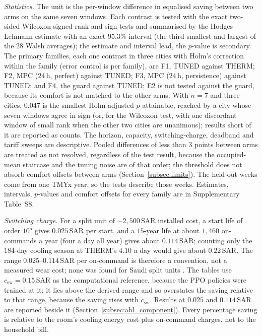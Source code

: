 \documentclass[pdflatex,sn-mathphys-num,iicol]{sn-jnl}
\theoremstyle{thmstyleone}\newtheorem{proposition}{Proposition}\newtheorem{corollary}{Corollary}
\theoremstyle{thmstyletwo}\newtheorem{remark}{Remark}\newtheorem{observation}{Observation}
\theoremstyle{thmstylethree}\newtheorem{definition}{Definition}
\newcommand{\csw}{c_{\mathrm{sw}}}
\newcommand{\SAR}{\text{SAR}}
\begin{document}
\emph{Statistics.} The unit is the per-window difference in equalised saving between two arms on the same seven windows. Each contrast is tested with the exact two-sided Wilcoxon signed-rank and sign tests and summarised by the Hodges--Lehmann estimate with an exact $95.3\%$ interval (the third smallest and largest of the $28$ Walsh averages); the estimate and interval lead, the $p$-value is secondary. The primary families, each one contrast in three cities with Holm's correction within the family (error control is per family), are F1, TUNED against THERM; F2, MPC ($24\,$h, perfect) against TUNED; F3, MPC ($24\,$h, persistence) against TUNED; and F4, the guard against TUNED; E2 is not tested against the guard, because its comfort is not matched to the other arms. With $n=7$ and three cities, $0.047$ is the smallest Holm-adjusted $p$ attainable, reached by a city whose seven windows agree in sign (or, for the Wilcoxon test, with one discordant window of small rank when the other two cities are unanimous); results short of it are reported as counts. The horizon, capacity, switching-charge, deadband and tariff sweeps are descriptive. Pooled differences of less than $3$ points between arms are treated as not resolved, regardless of the test result, because the occupied-mean staircase and the tuning noise are of that order; the threshold does not absorb comfort offsets between arms (Section~\ref{subsec:limits}). The held-out weeks come from one TMYx year, so the tests describe those weeks. Estimates, intervals, $p$-values and comfort offsets for every family are in Supplementary Table~S8.

\emph{Switching charge.} For a split unit of ${\sim}2{,}500\,\SAR$ installed cost, a start life of order $10^{5}$ gives $0.025\,\SAR$ per start, and a $15$-year life at about $1{,}460$ on-commands a year (four a day all year) gives about $0.114\,\SAR$; counting only the $184$-day cooling season at THERM's $4.10$ a day would give about $0.22\,\SAR$. The range $0.025$--$0.114\,\SAR$ per on-command is therefore a convention, not a measured wear cost; none was found for Saudi split units \citep{Pang2011}. The tables use $\csw=0.15\,\SAR$ as the computational reference, because the PPO policies were trained at it; it lies above the derived range and so overstates the saving relative to that range, because the saving rises with $\csw$. Results at $0.025$ and $0.114\,\SAR$ are reported beside it (Section~\ref{subsec:abl_component}). Every percentage saving is relative to the room's cooling energy cost plus on-command charges, not to the household bill.
 
\end{document}
